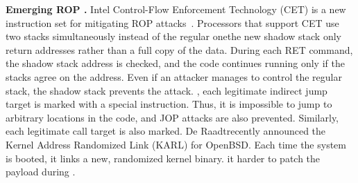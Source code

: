 \smallskip
\noindent\textbf{Emerging ROP \DIFdelbegin {}\DIFdelend \DIFaddbegin {}\DIFaddend .}
Intel Control-Flow Enforcement Technology (CET) is a new instruction set for mitigating ROP attacks~\cite{Int17}. Processors that support CET use two stacks simultaneously instead of the regular one\DIFdelbegin {}\DIFdelend \DIFaddbegin \DIFadd{; }\DIFaddend the new shadow stack \DIFdelbegin {}\DIFdelend \DIFaddbegin {}\DIFaddend only return addresses rather than a full copy of the data. During each RET command, the shadow stack address is checked, and the code continues running only if the stacks agree on the address. Even if an attacker manages to control the regular stack, the shadow stack prevents the attack. \DIFdelbegin {}\DIFdelend \DIFaddbegin {}\DIFaddend , each legitimate indirect jump target is marked with a special instruction. Thus, it is impossible to jump to arbitrary locations in the code, and JOP attacks are also prevented. Similarly, each legitimate call target is also marked. De Raadt\DIFaddbegin {}\DIFaddend recently announced the Kernel Address Randomized Link (KARL) for OpenBSD\DIFdelbegin {}\DIFdelend . Each time the system is booted, it links a new, randomized kernel binary. \DIFdelbegin {}\DIFdelend \DIFaddbegin {}\DIFaddend it harder to patch the payload during \DIFdelbegin {}\DIFdelend \DIFaddbegin {}\DIFaddend . 


